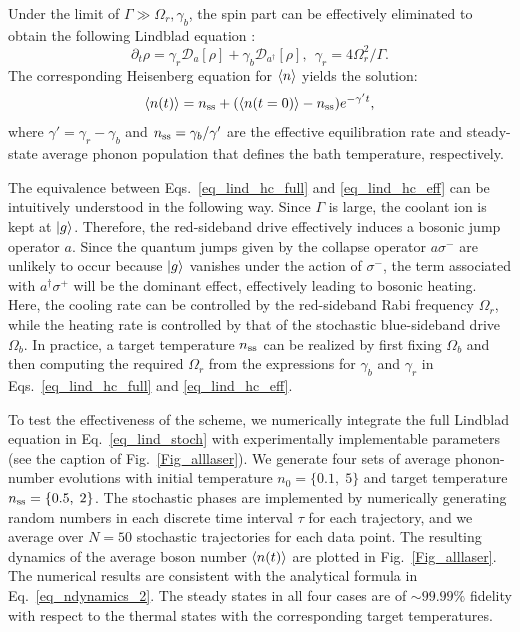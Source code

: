 \documentclass[%
reprint,
superscriptaddress,
amsmath,amssymb,
aps,
prl,
floatfix,
]{revtex4-2}
\begin{document}
Under the limit of $\Gamma\gg \Omega_r,\gamma_b$, the spin part can be effectively eliminated to obtain the following Lindblad equation \cite{kienzler2015thesis}:
\begin{equation}
\partial_t\rho=\gamma_r\mathcal{D}_a\left[\rho\right]+\gamma_b\mathcal{D}_{a^\dagger}\left[\rho\right], \:\: \gamma_r=4\Omega_r^2/\Gamma.
\label{eq_lind_hc_eff}
\end{equation}
The corresponding Heisenberg equation for $\braket{n}$ yields the solution:
\begin{equation}
    \braket{n(t)}=n_{\rm ss}+(\braket{n(t=0)}-n_{\rm ss})e^{-\gamma't},
    \label{eq_ndynamics_2}
\end{equation}
where $\gamma'=\gamma_r-\gamma_b$ and $n_{\rm ss}=\gamma_b/\gamma'$ are the effective equilibration rate and steady-state average phonon population that defines the bath temperature, respectively. 

The equivalence between Eqs.~\eqref{eq_lind_hc_full} and \eqref{eq_lind_hc_eff} can be intuitively understood in the following way. Since $\Gamma$ is large, the coolant ion is kept at $\ket{g}$. Therefore, the red-sideband drive effectively induces a bosonic jump operator $a$. Since the quantum jumps given by the collapse operator $a\sigma^-$ are unlikely to occur because $\ket{g}$ vanishes under the action of $\sigma^-$, the term associated with $a^\dagger\sigma^+$ will be the dominant effect, effectively leading to bosonic heating. Here, the cooling rate can be controlled by the red-sideband Rabi frequency $\Omega_r$, while the heating rate is controlled by that of the stochastic blue-sideband drive $\Omega_b$. In practice, a target temperature $n_{\rm ss}$ can be realized by first fixing $\Omega_b$ and then computing the required $\Omega_r$ from the expressions for $\gamma_b$ and $\gamma_r$ in Eqs.~\eqref{eq_lind_hc_full} and  \eqref{eq_lind_hc_eff}. 

To test the effectiveness of the scheme, we numerically integrate the full Lindblad equation in Eq.~\eqref{eq_lind_stoch} with experimentally implementable parameters (see the caption of Fig.~\ref{Fig_alllaser}). We generate four sets of average phonon-number evolutions with initial temperature $n_0=\{0.1,\;5\}$ and target temperature $n_{\rm ss}=\{0.5,\;2\}$. The stochastic phases are implemented by numerically generating random numbers in each discrete time interval $\tau$ for each trajectory, and we average over $N=50$ stochastic trajectories for each data point. The resulting dynamics of the average boson number $\braket{n(t)}$ are plotted in Fig.~\ref{Fig_alllaser}. The numerical results are consistent with the analytical formula in Eq.~\eqref{eq_ndynamics_2}. The steady states in all four cases are of $\sim 99.99\%$ fidelity with respect to the thermal states with the corresponding target temperatures.
\end{document}
